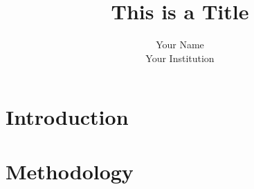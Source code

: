 \documentclass[twocolumn]{article}
\title{\color{red!70!black}\Huge This is a Title}
\author{\color{red!70!black}Your Name\\Your Institution}
\date{}
\begin{document}
\maketitle

\begin{abstract}
    \lipsum[1-2]
\end{abstract}

\section{Introduction}
    \lipsum[1-8]

\section{Methodology}
    \lipsum[1-8]
\end{document}
